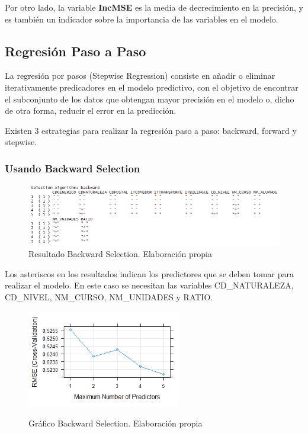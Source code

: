 \begin{subappendices}
Por otro lado, la variable \textbf{IncMSE} es la media de decrecimiento en la precisión, y es también un indicador sobre la importancia de las variables en el modelo.
\subsection{Regresión Paso a Paso}
La regresión por pasos (Stepwise Regression) consiste en añadir o eliminar iterativamente predicadores en el modelo predictivo, con el objetivo de encontrar el subconjunto de los datos que obtengan mayor precisión en el modelo o, dicho de otra forma, reducir el error en la predicción. \cite{kassambara2018}

Existen 3 estrategias para realizar la regresión paso a paso: backward, forward y stepwise.

\subsubsection{Usando Backward Selection}
\begin{figure}[htb]
	\centering
	\caption{Resultado Backward Selection. Elaboración propia}
	\label{fig:backwardSum}
	\includegraphics[width=1\textwidth]{recursos/ImagenesR/backwardSum}
	
\end{figure}
\FloatBarrier

Los asteriscos en los resultados indican los predictores que se deben tomar para realizar el modelo. En este caso se necesitan las variables CD\_NATURALEZA, CD\_NIVEL, NM\_CURSO, NM\_UNIDADES y RATIO.

\begin{figure}[htb]
	\centering
	\caption{Gráfico Backward Selection. Elaboración propia}
	\includegraphics[width=0.6\textwidth]{recursos/ImagenesR/backward}
	\label{fig:backward}
\end{figure}
\FloatBarrier


\end{subappendices}
